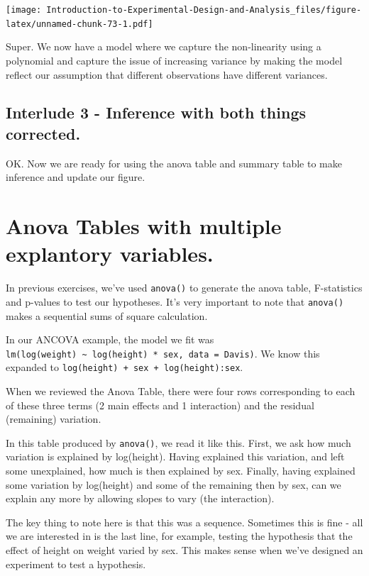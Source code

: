 \documentclass[
]{book}
\begin{document}
\texttt{[image: Introduction-to-Experimental-Design-and-Analysis\_files/figure-latex/unnamed-chunk-73-1.pdf]}

Super. We now have a model where we capture the non-linearity using a polynomial and capture the issue of increasing variance by making the model reflect our assumption that different observations have different variances.

\hypertarget{interlude-3---inference-with-both-things-corrected.}{%
\subsection{Interlude 3 - Inference with both things corrected.}\label{interlude-3---inference-with-both-things-corrected.}}

OK. Now we are ready for using the anova table and summary table to make inference and update our figure.

\hypertarget{anova-tables-with-multiple-explantory-variables.}{%
\section{Anova Tables with multiple explantory variables.}\label{anova-tables-with-multiple-explantory-variables.}}

In previous exercises, we've used \texttt{anova()} to generate the anova table, F-statistics and p-values to test our hypotheses. It's very important to note that \texttt{anova()} makes a sequential sums of square calculation.

In our ANCOVA example, the model we fit was \texttt{lm(log(weight)\ \textasciitilde{}\ log(height)\ *\ sex,\ data\ =\ Davis)}. We know this expanded to \texttt{log(height)\ +\ sex\ +\ log(height):sex}.

When we reviewed the Anova Table, there were four rows corresponding to each of these three terms (2 main effects and 1 interaction) and the residual (remaining) variation.

In this table produced by \texttt{anova()}, we read it like this. First, we ask how much variation is explained by log(height). Having explained this variation, and left some unexplained, how much is then explained by sex. Finally, having explained some variation by log(height) and some of the remaining then by sex, can we explain any more by allowing slopes to vary (the interaction).

The key thing to note here is that this was a sequence. Sometimes this is fine - all we are interested in is the last line, for example, testing the hypothesis that the effect of height on weight varied by sex. This makes sense when we've designed an experiment to test a hypothesis.
\end{document}
